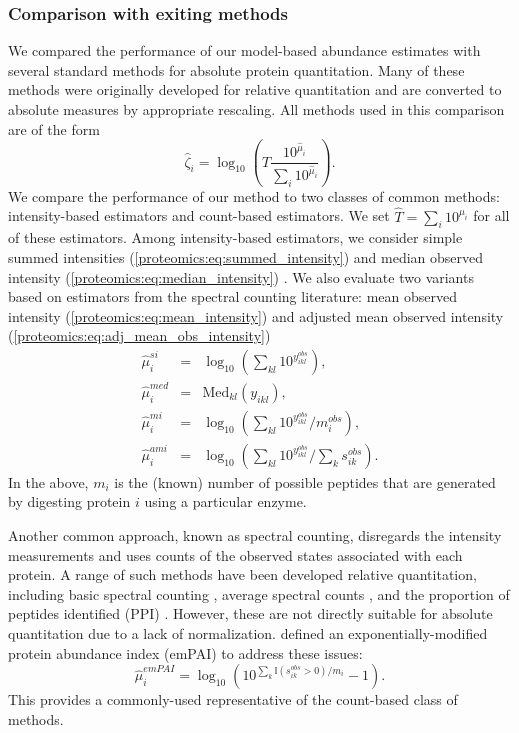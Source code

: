 \subsubsection{Comparison with exiting methods}
\label{proteomics:sec:compperf}

We compared the performance of our model-based abundance estimates with several standard methods for absolute protein quantitation.
Many of these methods were originally developed for relative quantitation and are converted to absolute measures by appropriate rescaling.
All methods used in this comparison are of the form
\begin{equation}
 \hat{\zeta}_i = \log_{10}\left( \hat{T} \frac{10^{\hat{\mu}_i}}{\sum_i 10^{\hat{\mu}_i}} \right) .
\end{equation}
%
We compare the performance of our method to two classes of common methods: intensity-based estimators and count-based estimators.
We set $\hat{T} = \sum_i 10^{\mu_i}$ for all of these estimators.
Among intensity-based estimators, we consider simple summed intensities  (\ref{proteomics:eq:summed_intensity}) and median observed intensity  (\ref{proteomics:eq:median_intensity}) \citep[e.g.,][]{Cox:2008uu}.
We also evaluate two variants based on estimators from the spectral counting literature: mean observed intensity (\ref{proteomics:eq:mean_intensity}) and adjusted mean observed intensity (\ref{proteomics:eq:adj_mean_obs_intensity})
\begin{eqnarray}
\hat \mu_{i}^{si} &=& \log_{10} \left( \sum_{kl} 10^{y^{obs}_{ikl}} \right),
\label{proteomics:eq:summed_intensity} \\
\hat \mu_{i}^{med} &=& \text{Med}_{kl}(y_{ikl}),
\label{proteomics:eq:median_intensity} \\
\hat \mu_{i}^{mi} &=& \log_{10}\left( \sum_{kl} 10^{y^{obs}_{ikl}}/m_i^{obs} \right),
\label{proteomics:eq:mean_intensity} \\
\hat \mu_{i}^{ami} &=& \log_{10}\left( \sum_{kl} 10^{y^{obs}_{ikl}}/\sum_{k} s^{obs}_{ik} \right) .
\label{proteomics:eq:adj_mean_obs_intensity}
\end{eqnarray}
%
In the above, $m_i$ is the (known) number of possible peptides that are generated by digesting protein $i$ using a particular enzyme.

Another common approach, known as spectral counting, disregards the intensity measurements and uses counts of the observed states associated with each protein.
A range of such methods have been developed relative quantitation, including basic spectral counting \citep[e.g.,][]{Liu:2004hv}, average spectral counts \citep[e.g.,][]{Weiss:2010ik}, and the proportion of peptides identified (PPI) \citep{Rappsilber2002}.
However, these are not directly suitable for absolute quantitation due to a lack of normalization.
\citet{Ishihama:2005ir} defined an exponentially-modified protein abundance index (emPAI) to address these issues:
%
\begin{equation}
\hat \mu_{i}^{emPAI} = \log_{10}\left( 10^{\sum_k \mathbb{I}(s_{ik}^{obs} > 0) / m_i } - 1 \right) .
\label{proteomics:eq:empai}
\end{equation}
This provides a commonly-used representative of the count-based class of methods.

